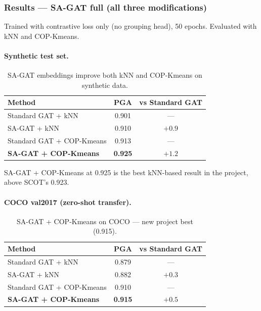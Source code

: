 \subsubsection{Results --- SA-GAT full (all three modifications)}

Trained with contrastive loss only (no grouping head), 50 epochs. Evaluated with kNN and COP-Kmeans.

\paragraph{Synthetic test set.}

\begin{table}[H]
\centering
\footnotesize
\begin{tabular}{lcc}
\toprule
Method & PGA & vs Standard GAT \\
\midrule
Standard GAT + kNN & 0.901 & --- \\
SA-GAT + kNN & 0.910 & $+0.9$ \\
Standard GAT + COP-Kmeans & 0.913 & --- \\
\textbf{SA-GAT + COP-Kmeans} & \textbf{0.925} & $\mathbf{+1.2}$ \\
\bottomrule
\end{tabular}
\caption{SA-GAT embeddings improve both kNN and COP-Kmeans on synthetic data.}
\end{table}

SA-GAT + COP-Kmeans at 0.925 is the best kNN-based result in the project, above SCOT's 0.923.

\paragraph{COCO val2017 (zero-shot transfer).}

\begin{table}[H]
\centering
\footnotesize
\begin{tabular}{lcc}
\toprule
Method & PGA & vs Standard GAT \\
\midrule
Standard GAT + kNN & 0.879 & --- \\
SA-GAT + kNN & 0.882 & $+0.3$ \\
Standard GAT + COP-Kmeans & 0.910 & --- \\
\textbf{SA-GAT + COP-Kmeans} & \textbf{0.915} & $\mathbf{+0.5}$ \\
\bottomrule
\end{tabular}
\caption{SA-GAT + COP-Kmeans on COCO --- new project best (0.915).}
\end{table}


